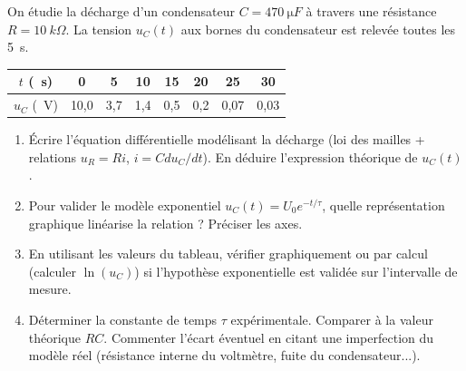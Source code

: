 \documentclass[11pt]{article}
\begin{document}
\begin{exercice}
On étudie la décharge d'un condensateur $C = \SI{470}{\micro F}$ à travers une résistance $R = \SI{10}{k\Omega}$. La tension $u_C(t)$ aux bornes du condensateur est relevée toutes les \SI{5}{s}.

\begin{center}
\begin{tabular}{|c|c|c|c|c|c|c|c|}
\hline
$t$ (\SI{}{s}) & 0 & 5 & 10 & 15 & 20 & 25 & 30 \\
\hline
$u_C$ (\SI{}{V}) & 10,0 & 3,7 & 1,4 & 0,5 & 0,2 & 0,07 & 0,03 \\
\hline
\end{tabular}
\end{center}

\begin{enumerate}
    \item Écrire l'équation différentielle modélisant la décharge (loi des mailles + relations $u_R = Ri$, $i = C du_C/dt$). En déduire l'expression théorique de $u_C(t)$.
    \item Pour valider le modèle exponentiel $u_C(t) = U_0 e^{-t/\tau}$, quelle représentation graphique linéarise la relation ? Préciser les axes.
    \item En utilisant les valeurs du tableau, vérifier graphiquement ou par calcul (calculer $\ln(u_C)$) si l'hypothèse exponentielle est validée sur l'intervalle de mesure.
    \item Déterminer la constante de temps $\tau$ expérimentale. Comparer à la valeur théorique $RC$. Commenter l'écart éventuel en citant une imperfection du modèle réel (résistance interne du voltmètre, fuite du condensateur...).
\end{enumerate}
\end{exercice}
\end{document}
